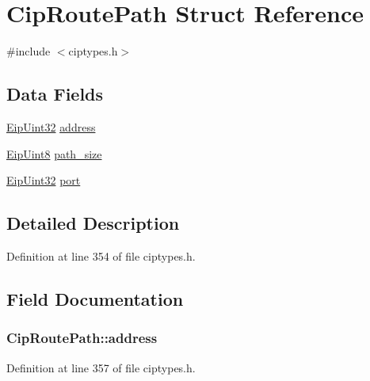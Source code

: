\hypertarget{structCipRoutePath}{\section{\-Cip\-Route\-Path \-Struct \-Reference}
\label{d4/d41/structCipRoutePath}
}


{\ttfamily \#include $<$ciptypes.\-h$>$}

\subsection*{\-Data \-Fields}
\begin{DoxyCompactItemize}
\item 
\hyperlink{typedefs_8h_abf2dd49262551294eb990ef8746a2767}{\-Eip\-Uint32} \hyperlink{structCipRoutePath_aab24ebaeafb979bb5de375b357940093}{address}
\item 
\hyperlink{typedefs_8h_aa0c108ee762a27720919a4634643040e}{\-Eip\-Uint8} \hyperlink{structCipRoutePath_a4e5b2e40afee896e16498f88ebbb4525}{path\-\_\-size}
\item 
\hyperlink{typedefs_8h_abf2dd49262551294eb990ef8746a2767}{\-Eip\-Uint32} \hyperlink{structCipRoutePath_aa48072f67c76ef536c4cdf8b6f63f30a}{port}
\end{DoxyCompactItemize}


\subsection{\-Detailed \-Description}


\-Definition at line 354 of file ciptypes.\-h.



\subsection{\-Field \-Documentation}
\hypertarget{structCipRoutePath_aab24ebaeafb979bb5de375b357940093}{
\subsubsection[{address}]{ {\bf \-Cip\-Route\-Path\-::address}}}\label{d4/d41/structCipRoutePath_aab24ebaeafb979bb5de375b357940093}


\-Definition at line 357 of file ciptypes.\-h.

